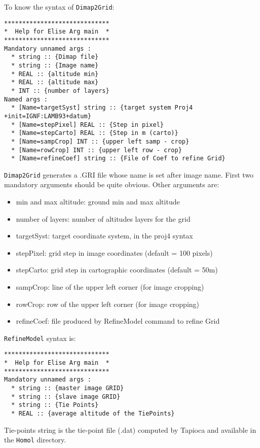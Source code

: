 To know the syntax of {\tt Dimap2Grid}:
\begin{verbatim}
*****************************
*  Help for Elise Arg main  *
*****************************
Mandatory unnamed args : 
  * string :: {Dimap file}
  * string :: {Image name}
  * REAL :: {altitude min}
  * REAL :: {altitude max}
  * INT :: {number of layers}
Named args : 
  * [Name=targetSyst] string :: {target system Proj4 +init=IGNF:LAMB93+datum}
  * [Name=stepPixel] REAL :: {Step in pixel}
  * [Name=stepCarto] REAL :: {Step in m (carto)}
  * [Name=sampCrop] INT :: {upper left samp - crop}
  * [Name=rowCrop] INT :: {upper left row - crop}
  * [Name=refineCoef] string :: {File of Coef to refine Grid}
\end{verbatim}

{\tt Dimap2Grid} generates a .GRI file whose name is set after image name.
First two mandatory arguments should be quite obvious. Other arguments are:
\begin{itemize}
\item min and max altitude: ground min and max altitude
\item number of layers: number of altitudes layers for the grid
\item targetSyst: target coordinate system, in the proj4 syntax
\item stepPixel: grid step in image coordinates (default = 100 pixels)
\item stepCarto: grid step in cartographic coordinates (default = 50m)
\item sampCrop: line of the upper left corner (for image cropping)
\item rowCrop: row of the upper left corner (for image cropping)
\item refineCoef: file produced by RefineModel command to refine Grid
\end{itemize}

{\tt RefineModel} syntax is: 

\begin{verbatim}
*****************************
*  Help for Elise Arg main  *
*****************************
Mandatory unnamed args : 
  * string :: {master image GRID}
  * string :: {slave image GRID}
  * string :: {Tie Points}
  * REAL :: {average altitude of the TiePoints}
\end{verbatim}

Tie-points string is the tie-point file (.dat) computed by Tapioca and available in the {\tt Homol} directory.